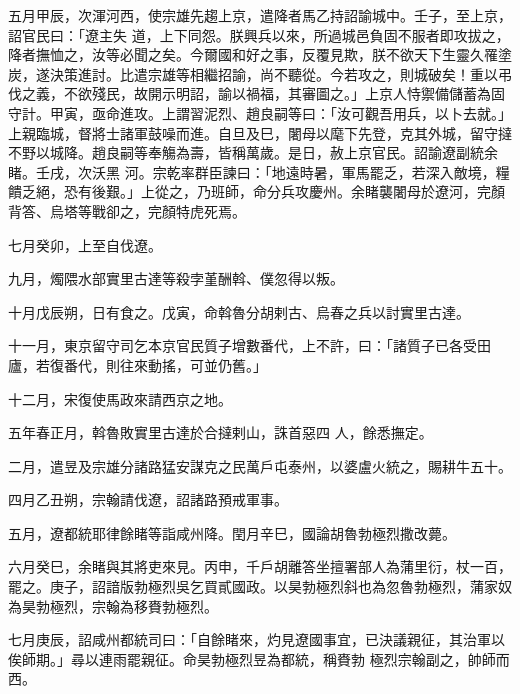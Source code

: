 \begin{pinyinscope}
 五月甲辰，次渾河西，使宗雄先趨上京，遣降者馬乙持詔諭城中。壬子，至上京，詔官民曰：「遼主失
 道，上下同怨。朕興兵以來，所過城邑負固不服者即攻拔之，降者撫恤之，汝等必聞之矣。今爾國和好之事，反覆見欺，朕不欲天下生靈久罹塗炭，遂決策進討。比遣宗雄等相繼招諭，尚不聽從。今若攻之，則城破矣！重以弔伐之義，不欲殘民，故開示明詔，諭以禍福，其審圖之。」上京人恃禦備儲蓄為固守計。甲寅，亟命進攻。上謂習泥烈、趙良嗣等曰：「汝可觀吾用兵，以卜去就。」上親臨城，督將士諸軍鼓噪而進。自旦及巳，闍母以麾下先登，克其外城，留守撻不野以城降。趙良嗣等奉觴為壽，皆稱萬歲。是日，赦上京官民。詔諭遼副統余睹。壬戌，次沃黑
 河。宗乾率群臣諫曰：「地遠時暑，軍馬罷乏，若深入敵境，糧饋乏絕，恐有後艱。」上從之，乃班師，命分兵攻慶州。余睹襲闍母於遼河，完顏背答、烏塔等戰卻之，完顏特虎死焉。



 七月癸卯，上至自伐遼。



 九月，燭隈水部實里古達等殺孛堇酬斡、僕忽得以叛。



 十月戊辰朔，日有食之。戊寅，命斡魯分胡剌古、烏春之兵以討實里古達。



 十一月，東京留守司乞本京官民質子增數番代，上不許，曰：「諸質子已各受田廬，若復番代，則往來動搖，可並仍舊。」



 十二月，宋復使馬政來請西京之地。



 五年春正月，斡魯敗實里古達於合撻剌山，誅首惡四
 人，餘悉撫定。



 二月，遣昱及宗雄分諸路猛安謀克之民萬戶屯泰州，以婆盧火統之，賜耕牛五十。



 四月乙丑朔，宗翰請伐遼，詔諸路預戒軍事。



 五月，遼都統耶律餘睹等詣咸州降。閏月辛巳，國論胡魯勃極烈撒改薨。



 六月癸巳，余睹與其將吏來見。丙申，千戶胡離答坐擅署部人為蒲里衍，杖一百，罷之。庚子，詔諳版勃極烈吳乞買貳國政。以昊勃極烈斜也為忽魯勃極烈，蒲家奴為昊勃極烈，宗翰為移賚勃極烈。



 七月庚辰，詔咸州都統司曰：「自餘睹來，灼見遼國事宜，已決議親征，其治軍以俟師期。」尋以連雨罷親征。命昊勃極烈昱為都統，稱賚勃
 極烈宗翰副之，帥師而西。




\end{pinyinscope}

